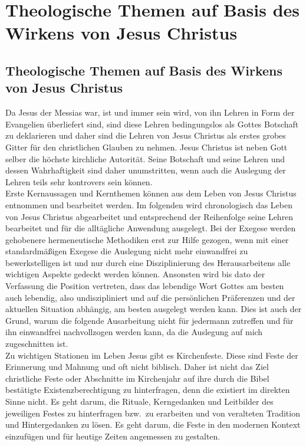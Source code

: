 \part{Theologische Themen auf Basis des Wirkens von Jesus Christus}
\chapter*{Theologische Themen auf Basis des Wirkens von Jesus Christus}
Da Jesus der Messias war, ist und immer sein wird, von ihn Lehren in Form der Evangelien überliefert sind, sind diese
Lehren bedingungslos als Gottes Botschaft zu deklarieren und daher sind die Lehren von Jesus Christus als erstes grobes Gitter für den christlichen Glauben zu nehmen. Jesus Christus ist neben Gott selber die höchste kirchliche Autorität. Seine Botschaft und seine Lehren und dessen Wahrhaftigkeit sind daher unumstritten, wenn auch die Auslegung der Lehren teils sehr kontrovers sein können.\\

Erste Kernaussagen und Kernthemen können aus dem Leben von Jesus Christus entnommen und bearbeitet werden. Im folgenden wird chronologisch das Leben von Jesus Christus abgearbeitet und entsprechend der Reihenfolge seine Lehren bearbeitet und für die alltägliche Anwendung ausgelegt. Bei der Exegese werden gehobenere hermeneutische Methodiken erst zur Hilfe gezogen, wenn mit einer standardmäßigen Exegese die Auslegung nicht mehr einwandfrei zu bewerkstelligen ist und nur durch eine Disziplinierung des Herausarbeitens alle wichtigen Aspekte gedeckt werden können. Ansonsten wird bis dato der Verfassung die Position vertreten, dass das lebendige Wort Gottes am besten auch lebendig, also undiszipliniert und auf die persönlichen Präferenzen und der aktuellen Situation abhängig, am besten ausgelegt werden kann. Dies ist auch der Grund, warum die folgende Ausarbeitung nicht für jedermann zutreffen und für ihn einwandfrei nachvollzogen werden kann, da die Auslegung auf mich zugeschnitten ist. \\

Zu wichtigen Stationen im Leben Jesus gibt es Kirchenfeste. Diese sind Feste der Erinnerung und Mahnung und oft nicht
biblisch. Daher ist nicht das Ziel christliche Feste oder Abschnitte im Kirchenjahr auf ihre durch die Bibel bestätigte Existenzberechtigung zu hinterfragen, denn die existiert im direkten Sinne nicht. Es geht darum, die Rituale, Kerngedanken und Leitbilder des jeweiligen Festes zu hinterfragen bzw.\ zu erarbeiten und von veralteten Tradition und Hintergedanken zu lösen. Es geht darum, die Feste in den modernen Kontext einzufügen und für heutige Zeiten angemessen zu gestalten.




